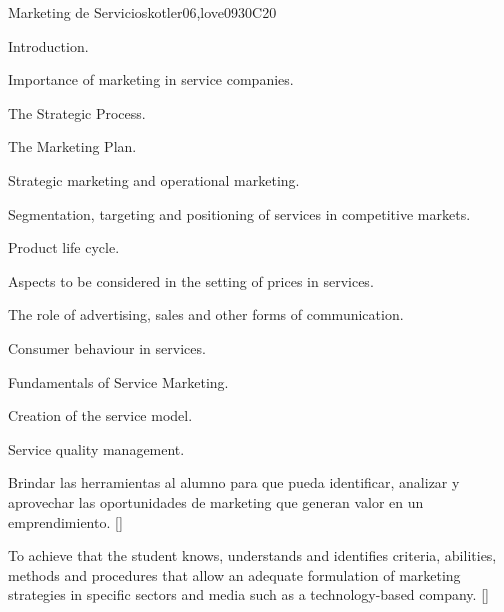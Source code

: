 \begin{syllabus}
\begin{unit}{}{Marketing de Servicios}{kotler06,love09}{30}{C20}
\begin{topics}
      \item Introduction.
      \item Importance of marketing in service companies.
      \item The Strategic Process.
      \item The Marketing Plan.
      \item Strategic marketing and operational marketing.
      \item Segmentation, targeting and positioning of services in competitive markets.
      \item Product life cycle.
      \item Aspects to be considered in the setting of prices in services.
      \item The role of advertising, sales and other forms of communication.
      \item Consumer behaviour in services.
      \item Fundamentals of Service Marketing.
      \item Creation of the service model.
      \item Service quality management.
   \end{topics}
   \begin{learningoutcomes}
      \item Brindar las herramientas al alumno para que pueda identificar, analizar y aprovechar las oportunidades de marketing que generan valor en un emprendimiento. [\Usage]
      \item To achieve that the student knows, understands and identifies criteria, abilities, methods and procedures that allow an adequate formulation of marketing strategies in specific sectors and media such as a technology-based company. [\Usage]
   \end{learningoutcomes}
\end{unit}


\end{syllabus}
